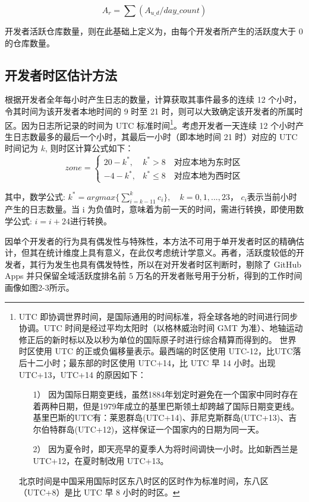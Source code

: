 $$ A_{r} = \sum (A_{u\_d} / day\_count) $$

开发者活跃仓库数量，则在此基础上定义为，由每个开发者所产生的活跃度大于 0 的仓库数量。

\subsection{开发者时区估计方法}

\par 根据开发者全年每小时产生日志的数量，计算获取其事件最多的连续 12 个小时，令其时间为该开发者本地时间的 9 时至 21 时，则可以大致确定该开发者的所属时区。因为日志所记录的时间为 UTC 标准时间\footnote{
UTC 即协调世界时间，是国际通用的时间标准，将全球各地的时间进行同步协调。UTC 时间是经过平均太阳时（以格林威治时间 GMT 为准）、地轴运动修正后的新时标以及以秒为单位的国际原子时进行综合精算而得到的。
世界时区使用 UTC 的正或负偏移量表示。最西端的时区使用 UTC-12，比UTC落后十二小时；最东部的时区使用 UTC+14，比 UTC 早 14 小时。出现 UTC+13，UTC+14 的原因如下：
    \begin{enumerate}
        \item[1）] 因为国际日期变更线，虽然1884年划定时避免在一个国家中同时存在着两种日期，但是1979年成立的基里巴斯领土却跨越了国际日期变更线。基里巴斯的UTC有：莱恩群岛(UTC+14)、菲尼克斯群岛(UTC+13)、吉尔伯特群岛(UTC+12)，这样保证一个国家内的日期为同一天。
        \item[2）] 因为夏令时，即天亮早的夏季人为将时间调快一小时。比如新西兰是 UTC+12，在夏时制改用 UTC+13。
    \end{enumerate}
北京时间是中国采用国际时区东八时区的区时作为标准时间，东八区（UTC+8）是比 UTC 早 8 小时的时区。
}。考虑开发者一天连续 12 个小时产生日志数最多的最后一个小时，其最后一小时（即本地时间 21 时）对应的 UTC 时间记为 $ k $, 则时区计算公式如下：
$$
    zone=
    \begin{cases}
        20-k^*, & k^*>8 \quad \text{对应本地为东时区}     \\
        -4-k^*, & k^*\le 8  \quad \text{对应本地为西时区}
    \end{cases}
$$

\par 其中，数学公式: $ k^*=argmax\{\sum_{i=k-11}^{k}{c_i} \},\quad  k=0,1,...,23 $， $ c_i $表示当前小时产生的日志数量。当 i 为负值时，意味着为前一天的时间，需进行转换，即使用数学公式: $ i=i+24 $进行转换。

\par 因单个开发者的行为具有偶发性与特殊性，本方法不可用于单开发者时区的精确估计，但其在统计维度上具有意义，在此仅考虑统计学意义。再者，活跃度较低的开发者，其行为发生也具有偶发特性，所以在对开发者时区判断时，剔除了 GitHub Apps 并只保留全域活跃度排名前 5 万名的开发者账号用于分析，得到的工作时间画像如图2-3所示。

